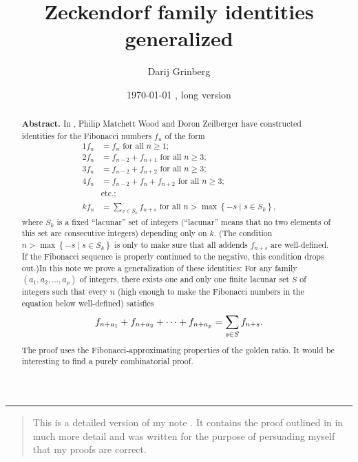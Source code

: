 \documentclass[numbers=enddot,12pt,final,onecolumn,notitlepage]{scrartcl}%
\numberwithin{exer}{section}
\theoremstyle{definition}
\newenvironment{statement}{\begin{quote}}{\end{quote}}
\let\sumnonlimits\sum
\renewcommand{\sum}{\sumnonlimits\limits}
\begin{document}
\title{Zeckendorf family identities generalized}
\author{Darij Grinberg}
\date{
\today
, long version}
\maketitle

\begin{abstract}
\textbf{Abstract.} In \cite{1}, Philip Matchett Wood and Doron Zeilberger have
constructed identities for the Fibonacci numbers $f_{n}$ of the form%
\begin{align*}
1f_{n}  &  =f_{n}\text{ for all }n\geq1;\\
2f_{n}  &  =f_{n-2}+f_{n+1}\text{ for all }n\geq3;\\
3f_{n}  &  =f_{n-2}+f_{n+2}\text{ for all }n\geq3;\\
4f_{n}  &  =f_{n-2}+f_{n}+f_{n+2}\text{ for all }n\geq3;\\
&  \text{etc.;}\\
kf_{n}  &  =\sum_{s\in S_{k}}f_{n+s}\text{ for all }n>\max\left\{  -s\mid s\in
S_{k}\right\}  \text{,}%
\end{align*}
where $S_{k}$ is a fixed ``lacunar'' set of integers (``lacunar'' means that
no two elements of this set are consecutive integers) depending only on $k$.
(The condition $n>\max\left\{  -s\mid s\in S_{k}\right\}  $ is only to make
sure that all addends $f_{n+s}$ are well-defined. If the Fibonacci sequence is
properly continued to the negative, this condition drops out.)\newline In this
note we prove a generalization of these identities: For any family $\left(
a_{1},a_{2},\ldots,a_{p}\right)  $ of integers, there exists one and only one
finite lacunar set $S$ of integers such that every $n$ (high enough to make
the Fibonacci numbers in the equation below well-defined) satisfies
\[
f_{n+a_{1}}+f_{n+a_{2}}+\cdots+f_{n+a_{p}}=\sum\limits_{s\in S}f_{n+s}.
\]
The proof uses the Fibonacci-approximating properties of the golden ratio. It
would be interesting to find a purely combinatorial proof.

\end{abstract}



\hrule


\begin{statement}
This is a detailed version of my note \cite{this.short}. It contains the proof
outlined in \cite{this.short} in much more detail and was written for the
purpose of persuading myself that my proofs are correct.
\end{statement}
\end{document}
